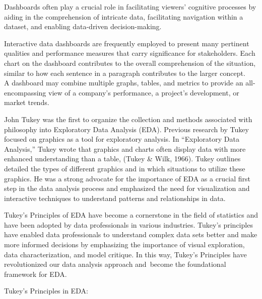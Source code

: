 \documentclass[print]{nuthesis}
\begin{document}
Dashboards often play a crucial role in facilitating viewers' cognitive processes by aiding in the comprehension of intricate data, facilitating navigation within a dataset, and enabling data-driven decision-making.

Interactive data dashboards are frequently employed to present many pertinent qualities and performance measures that carry significance for stakeholders.
Each chart on the dashboard contributes to the overall comprehension of the situation, similar to how each sentence in a paragraph contributes to the larger concept.\\
A dashboard may combine multiple graphs, tables, and metrics to provide an all-encompassing view of a company's performance, a project's development, or market trends.

John Tukey was the first to organize the collection and methods associated with philosophy into Exploratory Data Analysis (EDA).
Previous research by Tukey focused on graphics as a tool for exploratory analysis.
In ``Exploratory Data Analysis,'' Tukey wrote that graphics and charts often display data with more enhanced understanding than a table, (Tukey \& Wilk, 1966).
Tukey outlines detailed the types of different graphics and in which situations to utilize these graphics.
He was a strong advocate for the importance of EDA as a crucial first step in the data analysis process and emphasized the need for visualization and interactive techniques to understand patterns and relationships in data.

Tukey's Principles of EDA have become a cornerstone in the field of statistics and have been adopted by data professionals in various industries.
Tukey's principles have enabled data professionals to understand complex data sets better and make more informed decisions by emphasizing the importance of visual exploration, data characterization, and model critique.
In this way, Tukey's Principles have revolutionized our data analysis approach and~become the foundational framework for EDA.

Tukey's Principles in EDA:
\end{document}
